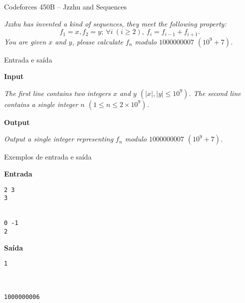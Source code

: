 \begin{frame}[fragile]{Codeforces 450B -- Jzzhu and Sequences}

{\it
Jzzhu has invented a kind of sequences, they meet the following property:
\[
    f_1 = x, f_2 = y;\ \forall i\ (i \geq 2),\  f_i = f_{i - 1} + f_{i + 1}.
\]
You are given $x$ and $y$, please calculate $f_n$ modulo $1000000007$ $(10^9 + 7)$.
}
\end{frame}

\begin{frame}[fragile]{Entrada e saída}

\textbf{Input}

{\it
The first line contains two integers $x$ and $y$ $(|x|, |y| \leq 10^9)$. The second line contains a single integer $n$ $(1 \leq n \leq 2\times 10^9)$.
}

\vspace{0.2in}

\textbf{Output}

{\it
Output a single integer representing $f_n$ modulo $1000000007$ $(10^9 + 7)$.
}

\end{frame}

\begin{frame}[fragile]{Exemplos de entrada e saída}

\begin{minipage}[t]{0.45\textwidth}
\textbf{Entrada}
\begin{verbatim}
2 3
3


0 -1
2
\end{verbatim}
\end{minipage}
\begin{minipage}[t]{0.5\textwidth}
\textbf{Saída}
\begin{verbatim}
1



1000000006
\end{verbatim}
\end{minipage}

\end{frame}




